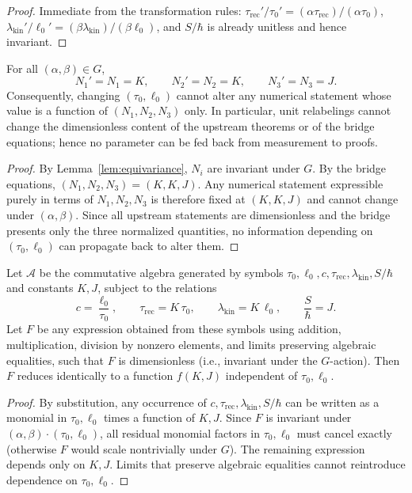 \documentclass[11pt]{article}
\theoremstyle{plain}
\theoremstyle{definition}
\theoremstyle{remark}
\begin{document}
\begin{proof}
Immediate from the transformation rules: \(\tau_{\mathrm{rec}}'/\tau_{0}'=(\alpha\tau_{\mathrm{rec}})/(\alpha\tau_{0})\), \(\lambda_{\mathrm{kin}}'/\ell_{0}'=(\beta\lambda_{\mathrm{kin}})/(\beta\ell_{0})\), and \(S/\hbar\) is already unitless and hence invariant.
\end{proof}

\begin{theorem}\label{thm:nocirc}
For all \((\alpha,\beta)\in G\),
\[
N_{1}'=N_{1}=K,\qquad N_{2}'=N_{2}=K,\qquad N_{3}'=N_{3}=J.
\]
Consequently, changing \((\tau_{0},\ell_{0})\) cannot alter any numerical statement whose value is a function of \((N_{1},N_{2},N_{3})\) only. In particular, unit relabelings cannot change the dimensionless content of the upstream theorems or of the bridge equations; hence no parameter can be fed back from measurement to proofs.
\end{theorem}

\begin{proof}
By Lemma~\ref{lem:equivariance}, \(N_{i}\) are invariant under \(G\). By the bridge equations, \((N_{1},N_{2},N_{3})=(K,K,J)\). Any numerical statement expressible purely in terms of \(N_{1},N_{2},N_{3}\) is therefore fixed at \((K,K,J)\) and cannot change under \((\alpha,\beta)\). Since all upstream statements are dimensionless and the bridge presents only the three normalized quantities, no information depending on \((\tau_{0},\ell_{0})\) can propagate back to alter them.
\end{proof}

\begin{lemma}\label{lem:elimination}
Let \(\mathcal{A}\) be the commutative algebra generated by symbols \(\tau_{0},\ell_{0},c,\tau_{\mathrm{rec}},\lambda_{\mathrm{kin}},S/\hbar\) and constants \(K,J\), subject to the relations
\[
c=\frac{\ell_{0}}{\tau_{0}},\qquad \tau_{\mathrm{rec}}=K\,\tau_{0},\qquad \lambda_{\mathrm{kin}}=K\,\ell_{0},\qquad \frac{S}{\hbar}=J.
\]
Let \(F\) be any expression obtained from these symbols using addition, multiplication, division by nonzero elements, and limits preserving algebraic equalities, such that \(F\) is dimensionless (i.e., invariant under the \(G\)-action). Then \(F\) reduces identically to a function \(f(K,J)\) independent of \(\tau_{0},\ell_{0}\).
\end{lemma}

\begin{proof}
By substitution, any occurrence of \(c,\tau_{\mathrm{rec}},\lambda_{\mathrm{kin}},S/\hbar\) can be written as a monomial in \(\tau_{0},\ell_{0}\) times a function of \(K,J\). Since \(F\) is invariant under \((\alpha,\beta)\cdot(\tau_{0},\ell_{0})\), all residual monomial factors in \(\tau_{0},\ell_{0}\) must cancel exactly (otherwise \(F\) would scale nontrivially under \(G\)). The remaining expression depends only on \(K,J\). Limits that preserve algebraic equalities cannot reintroduce dependence on \(\tau_{0},\ell_{0}\).
\end{proof}
\end{document}
